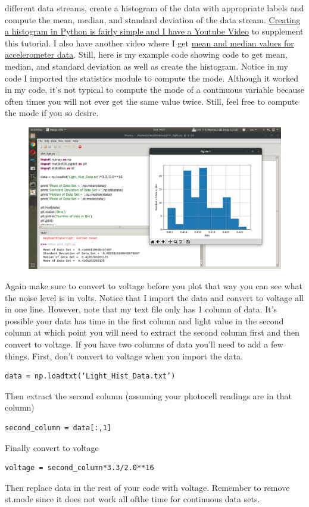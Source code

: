 different data streams, create a histogram of the data with
appropriate labels and compute the mean, median, and standard
deviation of the data
stream. \href{https://www.youtube.com/watch?v=bfeJfAWTqzY&list=PL_D7_GvGz-v1RsDs_OdNW65qRjEjmpfQx&index=22&t=0s}{Creating
a histogram in Python is fairly simple and I have a Youtube Video} to
supplement this tutorial. I also have another video where I
get \href{https://www.youtube.com/watch?v=e4xs9Ky7_YI&list=PL_D7_GvGz-v1RsDs_OdNW65qRjEjmpfQx&index=20&t=0s}{mean
and median values for accelerometer data}. Still, here is my example
code showing code to get mean, median, and standard deviation as well
as create the histogram. Notice in my code I imported the statistics
module to compute the mode. Although it worked in my code, it’s not
typical to compute the mode of a continuous variable because often
times you will not ever get the same value twice. Still, feel free to
compute the mode if you so desire. 
\begin{figure}[H]
  \begin{center}
    \includegraphics[width=\textwidth]{Figures/histogram.png}
  \end{center}
\end{figure}
Again make sure to convert to voltage before you plot that way you can see what the noise level is in volts. Notice that I import the data and convert to voltage all in one line. However, note that my text file only has 1 column of data. It’s possible your data has time in the first column and light value in the second column at which point you will need to extract the second column first and then convert to voltage. If you have two columns of data you’ll need to add a few things. First, don’t convert to voltage when you import the data.
\begin{verbatim}
data = np.loadtxt(‘Light_Hist_Data.txt’)
\end{verbatim}
Then extract the second column (assuming your photocell readings are in that column)
\begin{verbatim}
second_column = data[:,1]
\end{verbatim}
Finally convert to voltage
\begin{verbatim}
voltage = second_column*3.3/2.0**16
\end{verbatim}
Then replace data in the rest of your code with voltage. Remember to remove st.mode since it does not work all ofthe time for continuous data sets. 
